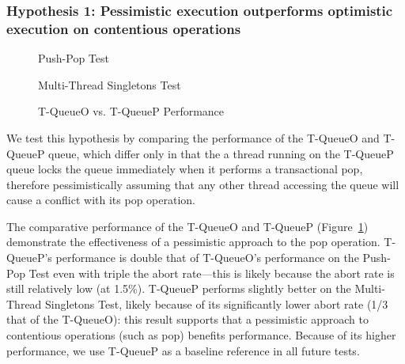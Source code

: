 \subsubsection{Hypothesis 1: Pessimistic execution outperforms optimistic execution on contentious operations}
\begin{figure}[H]
    \centering
	\begin{minipage}{0.75\textwidth}
        \caption*{Push-Pop Test}
        \vspace{12pt}
	\end{minipage}
	\begin{minipage}{0.75\textwidth}
        \caption*{Multi-Thread Singletons Test}
	\end{minipage}
    \caption{T-QueueO vs. T-QueueP Performance}
    \label{fig:stoqs}
\end{figure}


We test this hypothesis by comparing the performance of the T-QueueO and T-QueueP queue, which differ only in that the a thread running on the T-QueueP queue locks the queue immediately when it performs a transactional pop, therefore pessimistically assuming that any other thread accessing the queue will cause a conflict with its pop operation.

The comparative performance of the T-QueueO and T-QueueP (Figure~\ref{fig:stoqs}) demonstrate the effectiveness of a pessimistic approach to the pop operation. T-QueueP's performance is double that of T-QueueO's performance on the Push-Pop Test even with triple the abort rate---this is likely because the abort rate is still relatively low (at 1.5\%). T-QueueP performs slightly better on the Multi-Thread Singletons Test, likely because of its significantly lower abort rate (1/3 that of the T-QueueO): this result supports that a pessimistic approach to contentious operations (such as pop) benefits performance. Because of its higher performance, we use T-QueueP as a baseline reference in all future tests.

\vspace{12pt}
\noindent{}


